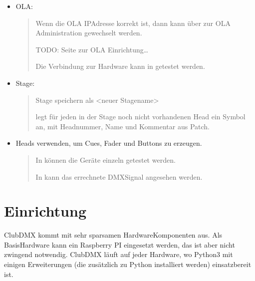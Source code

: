 \documentclass[letterpaper,10pt,ngerman]{sphinxmanual}
\begin{document}
\begin{itemize}
\item {} 
OLA:
\begin{quote}

Wenn die OLA IP\sphinxhyphen{}Adresse korrekt ist, dann kann über
zur OLA Administration gewechselt werden.

TODO: Seite zur OLA Einrichtung…

Die Verbindung zur Hardware kann in
 getestet werden.
\end{quote}

\item {} 
Stage:
\begin{quote}

Stage  speichern als \textless{}neuer Stagename\textgreater{}

 legt für jeden in der Stage noch nicht vorhandenen Head
ein Symbol an, mit Headnummer, Name und Kommentar aus Patch.
\end{quote}

\item {} 
Heads verwenden, um Cues, Fader und Buttons zu erzeugen.
\begin{quote}

In  können die Geräte einzeln getestet werden.

In  kann das errechnete DMX\sphinxhyphen{}Signal
angesehen werden.
\end{quote}

\end{itemize}


\chapter{Einrichtung}
\label{\detokenize{einrichten:einrichtung}}\label{\detokenize{einrichten:einrichten-label}}\label{\detokenize{einrichten::doc}}
ClubDMX kommt mit sehr sparsamen Hardware\sphinxhyphen{}Komponenten aus. Als
Basis\sphinxhyphen{}Hardware kann ein Raspberry PI eingesetzt werden, das ist aber
nicht zwingend notwendig. ClubDMX läuft auf jeder Hardware, wo
Python\sphinxhyphen{}3 mit einigen Erweiterungen (die zusätzlich zu Python
installiert werden) einsatzbereit ist.
\end{document}
